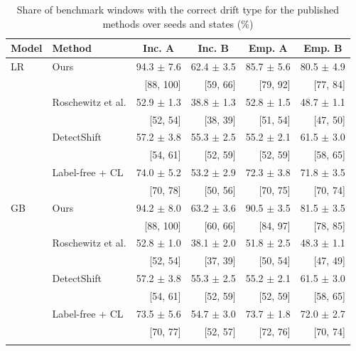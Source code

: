 \documentclass[pdflatex,sn-basic]{sn-jnl}
\begin{document}
\begin{table}[!htbp]\centering\tablebodyfont
\caption{Share of benchmark windows with the correct drift type for the published methods over seeds and states (\%)}\label{tab:seedspublished}%
\begin{tabular}{@{}llrrrr@{}}
\toprule
Model & Method & \multicolumn{1}{c}{Inc. A} & \multicolumn{1}{c}{Inc. B} & \multicolumn{1}{c}{Emp. A} & \multicolumn{1}{c}{Emp. B} \\
\midrule
LR & Ours & 94.3 $\pm$ 7.6 & 62.4 $\pm$ 3.5 & 85.7 $\pm$ 5.6 & 80.5 $\pm$ 4.9 \\
 &  & [88, 100] & [59, 66] & [79, 92] & [77, 84] \\
 & Roschewitz et al. & 52.9 $\pm$ 1.3 & 38.8 $\pm$ 1.3 & 52.8 $\pm$ 1.5 & 48.7 $\pm$ 1.1 \\
 &  & [52, 54] & [38, 39] & [51, 54] & [47, 50] \\
 & DetectShift & 57.2 $\pm$ 3.8 & 55.3 $\pm$ 2.5 & 55.2 $\pm$ 2.1 & 61.5 $\pm$ 3.0 \\
 &  & [54, 61] & [52, 59] & [52, 59] & [58, 65] \\
 & Label-free + CL & 74.0 $\pm$ 5.2 & 53.2 $\pm$ 2.9 & 72.3 $\pm$ 3.8 & 71.8 $\pm$ 3.5 \\
 &  & [70, 78] & [50, 56] & [70, 75] & [70, 74] \\
\midrule
GB & Ours & 94.2 $\pm$ 8.0 & 63.2 $\pm$ 3.6 & 90.5 $\pm$ 3.5 & 81.5 $\pm$ 3.5 \\
 &  & [88, 100] & [60, 66] & [84, 97] & [78, 85] \\
 & Roschewitz et al. & 52.8 $\pm$ 1.0 & 38.1 $\pm$ 2.0 & 51.8 $\pm$ 2.5 & 48.3 $\pm$ 1.1 \\
 &  & [52, 54] & [37, 39] & [50, 54] & [47, 49] \\
 & DetectShift & 57.2 $\pm$ 3.8 & 55.3 $\pm$ 2.5 & 55.2 $\pm$ 2.1 & 61.5 $\pm$ 3.0 \\
 &  & [54, 61] & [52, 59] & [52, 59] & [58, 65] \\
 & Label-free + CL & 73.5 $\pm$ 5.6 & 54.7 $\pm$ 3.0 & 73.7 $\pm$ 1.8 & 72.0 $\pm$ 2.7 \\
 &  & [70, 77] & [52, 57] & [72, 76] & [70, 74] \\
\botrule
\end{tabular}
\end{table}
\end{document}
